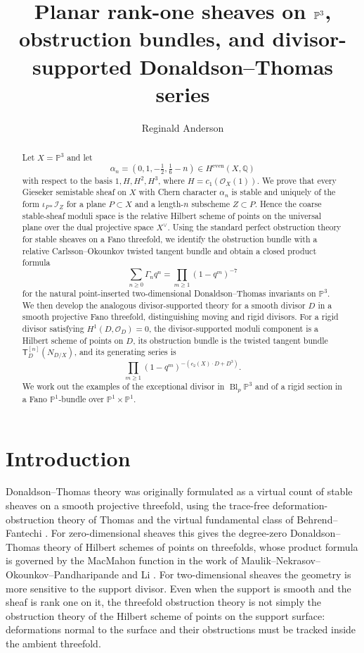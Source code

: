 \documentclass[12pt]{amsart}
\title[Planar rank-one sheaves on $\PP^3$]{Planar rank-one sheaves on $\PP^3$, obstruction bundles, and divisor-supported Donaldson--Thomas series}
\author[Reginald Anderson]{Reginald Anderson}
\date{}
\numberwithin{equation}{section}
\newcommand{\PP}{\mathbb{P}}
\newcommand{\Q}{\mathbb{Q}}
\newcommand{\OO}{\mathcal{O}}
\newcommand{\I}{\mathcal{I}}
\newcommand{\Ttw}{\mathsf{T}}
\newcommand{\dual}{\vee}
\theoremstyle{plain}
\theoremstyle{definition}
\theoremstyle{remark}
\begin{document}
\begin{abstract}
Let $X=\PP^3$ and let
\[
\alpha_n=(0,1,-\tfrac12,\tfrac16-n)\in H^{\mathrm{even}}(X,\Q)
\]
with respect to the basis $1,H,H^2,H^3$, where $H=c_1(\OO_X(1))$.
We prove that every Gieseker semistable sheaf on $X$ with Chern character $\alpha_n$ is stable and uniquely of the form $\iota_{P*}\I_Z$ for a plane $P\subset X$ and a length-$n$ subscheme $Z\subset P$.
Hence the coarse stable-sheaf moduli space is the relative Hilbert scheme of points on the universal plane over the dual projective space $X^\dual$.
Using the standard perfect obstruction theory for stable sheaves on a Fano threefold, we identify the obstruction bundle with a relative Carlsson--Okounkov twisted tangent bundle and obtain a closed product formula
\[
\sum_{n\ge 0} \Gamma_n q^n=\prod_{m\ge 1}(1-q^m)^{-7}
\]
for the natural point-inserted two-dimensional Donaldson--Thomas invariants on $\PP^3$.
We then develop the analogous divisor-supported theory for a smooth divisor $D$ in a smooth projective Fano threefold, distinguishing moving and rigid divisors.
For a rigid divisor satisfying $H^1(D,\OO_D)=0$, the divisor-supported moduli component is a Hilbert scheme of points on $D$, its obstruction bundle is the twisted tangent bundle $\Ttw_D^{[n]}(N_{D/X})$, and its generating series is
\[
\prod_{m\ge 1}(1-q^m)^{-(c_2(X)\cdot D+D^3)}.
\]
We work out the examples of the exceptional divisor in $\operatorname{Bl}_p\PP^3$ and of a rigid section in a Fano $\PP^1$-bundle over $\PP^1\times\PP^1$.
\end{abstract}

\maketitle

\section{Introduction}

Donaldson--Thomas theory was originally formulated as a virtual count of stable sheaves on a smooth projective threefold, using the trace-free deformation-obstruction theory of Thomas \cite{Thomas} and the virtual fundamental class of Behrend--Fantechi \cite{BF}.
For zero-dimensional sheaves this gives the degree-zero Donaldson--Thomas theory of Hilbert schemes of points on threefolds, whose product formula is governed by the MacMahon function in the work of Maulik--Nekrasov--Okounkov--Pandharipande and Li \cite{MNOP,Li}.
For two-dimensional sheaves the geometry is more sensitive to the support divisor.
Even when the support is smooth and the sheaf is rank one on it, the threefold obstruction theory is not simply the obstruction theory of the Hilbert scheme of points on the support surface: deformations normal to the surface and their obstructions must be tracked inside the ambient threefold.
\end{document}
